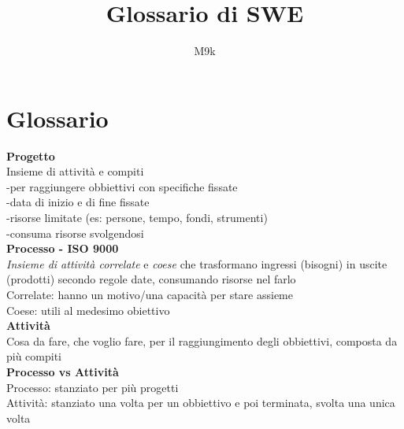 \documentclass{article}
\begin{document}
\title{Glossario di SWE}
\author{M9k}
\maketitle

	
\section{Glossario}
		\textbf{Progetto}\\
		Insieme di attività e compiti\\
		-per raggiungere obbiettivi con specifiche fissate\\
		-data di inizio e di fine fissate\\
		-risorse limitate (es: persone, tempo, fondi, strumenti)\\
		-consuma risorse svolgendosi\\
			
		\textbf{Processo - ISO 9000}\\
		\textit{Insieme di attività correlate} e \textit{coese} che trasformano ingressi (bisogni) in uscite (prodotti) secondo regole date, consumando risorse nel farlo\\
		Correlate: hanno un motivo/una capacità per stare assieme\\
		Coese: utili al medesimo obiettivo\\
		
		\textbf{Attività}\\
		Cosa da fare, che voglio fare, per il raggiungimento degli obbiettivi, composta da più compiti\\
		
		\textbf{Processo vs Attività}\\
		Processo: stanziato per più progetti\\
		Attività: stanziato una volta per un obbiettivo e poi terminata, svolta una unica volta\\
		
\end{document}
